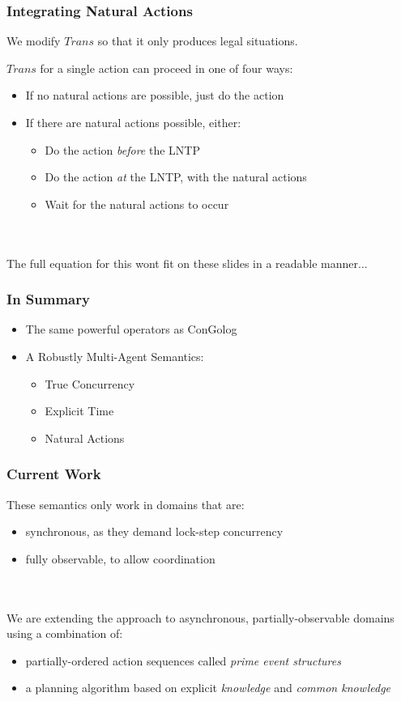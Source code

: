 \documentclass[compress]{beamer}
\begin{document}
\begin{frame}
\frametitle{Integrating Natural Actions}
We modify $Trans$ so that it only produces legal situations.

$Trans$ for a single action can proceed in one of four ways:
\begin{itemize}
\item If no natural actions are possible, just do the action
\item If there are natural actions possible, either:
\begin{itemize}
\item Do the action \emph{before} the LNTP
\item Do the action \emph{at} the LNTP, with the natural actions
\item Wait for the natural actions to occur
\end{itemize}
\end{itemize}
\ \\
\ \\
The full equation for this wont fit on these slides in a readable manner...
\end{frame}

\begin{frame}
\frametitle{In Summary}
\begin{itemize}
\item The same powerful operators as ConGolog
\item A Robustly Multi-Agent Semantics:
\begin{itemize}
\item True Concurrency
\item Explicit Time
\item Natural Actions
\end{itemize}
\end{itemize}
\end{frame}

\begin{frame}
\frametitle{Current Work}
These semantics only work in domains that are:
\begin{itemize}
\item synchronous, as they demand lock-step concurrency
\item fully observable, to allow coordination
\end{itemize}
\ \\
\ \\
We are extending the approach to asynchronous, partially-observable domains using a combination of:
\begin{itemize}
\item partially-ordered action sequences called \emph{prime event structures}
\item a planning algorithm based on explicit \emph{knowledge} and \emph{common knowledge}
\end{itemize}
\end{frame}
\end{document}
